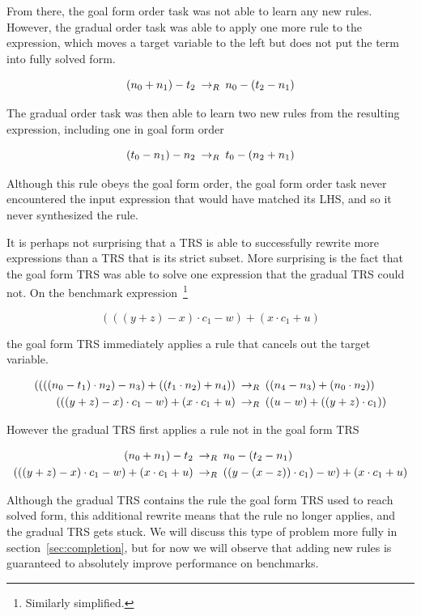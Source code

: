 From there, the goal form order task was not able to learn any new rules. However, the gradual order task was able to apply one more rule to the expression, which moves a target variable to the left but does not put the term into fully solved form.

\[ (n_0 + n_1) - t_2 \:\rightarrow_{R}\: n_0 - (t_2 - n_1)
\]

The gradual order task was then able to learn two new rules from the resulting expression, including one in goal form order

\[ (t_0 - n_1) - n_2 \:\rightarrow_{R}\: t_0 - (n_2  + n_1)
\]

Although this rule obeys the goal form order, the goal form order task never encountered the input expression that would have matched its LHS, and so it never synthesized the rule.

It is perhaps not surprising that a TRS is able to successfully rewrite more expressions than a TRS that is its strict subset. More surprising is the fact that the goal form TRS was able to solve one expression that the gradual TRS could not. On the benchmark expression~\footnote{Similarly simplified.}

\[ (((y + z) - x) \cdot c_1 - w) + (x \cdot c_1 + u)
\]

the goal form TRS immediately applies a rule that cancels out the target variable.

\begin{align*} 
((((n_0 - t_1) \cdot n_2) - n_3) + ((t_1 \cdot n_2) + n_4)) & \:\rightarrow_{R}\: ((n_4 - n_3) + (n_0 \cdot n_2)) \\
(((y + z) - x) \cdot c_1 - w) + (x \cdot c_1 + u) & \:\rightarrow_{R}\: ((u - w) + ((y + z) \cdot c_1))
\end{align*}

However the gradual TRS first applies a rule not in the goal form TRS

\begin{align*}
(n_0 + n_1) - t_2 & \:\rightarrow_{R}\: n_0 - (t_2 - n_1) \\
(((y + z) - x) \cdot c_1 - w) + (x \cdot c_1 + u) & \:\rightarrow_{R}\: ((y - (x - z)) \cdot c_1) - w) + (x \cdot c_1 + u)
\end{align*}

Although the gradual TRS contains the rule the goal form TRS used to reach solved form, this additional rewrite means that the rule no longer applies, and the gradual TRS gets stuck. We will discuss this type of problem more fully in section~\ref{sec:completion}, but for now we will observe that adding new rules is guaranteed to absolutely improve performance on benchmarks.

